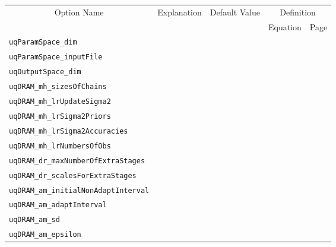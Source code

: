 \begin{sidewaystable}
\begin{tabular}{|l|c|c|c|c|}
\hline
\multicolumn{1}{|c|}{Option Name}        & Explanation       & Default Value & \multicolumn{2}{c|}{Definition} \\
\cline{4-5}
                                         &                   &               & Equation    & Page              \\
\hline
\verb=uqParamSpace_dim=                  &                   &               &             &                   \\
\hline
\verb=uqParamSpace_inputFile=            &                   &               &             &                   \\
\hline
\verb=uqOutputSpace_dim=                 &                   &               &             &                   \\
\hline
\verb=uqDRAM_mh_sizesOfChains=           &                   &               &             &                   \\
\hline
\verb=uqDRAM_mh_lrUpdateSigma2=          &                   &               &             &                   \\
\hline
\verb=uqDRAM_mh_lrSigma2Priors=          &                   &               &             &                   \\
\hline
\verb=uqDRAM_mh_lrSigma2Accuracies=      &                   &               &             &                   \\
\hline
\verb=uqDRAM_mh_lrNumbersOfObs=          &                   &               &             &                   \\
\hline
\verb=uqDRAM_dr_maxNumberOfExtraStages=  &                   &               &             &                   \\
\hline
\verb=uqDRAM_dr_scalesForExtraStages=    &                   &               &             &                   \\
\hline
\verb=uqDRAM_am_initialNonAdaptInterval= &                   &               &             &                   \\
\hline
\verb=uqDRAM_am_adaptInterval=           &                   &               &             &                   \\
\hline
\verb=uqDRAM_am_sd=                      &                   &               &             &                   \\
\hline
\verb=uqDRAM_am_epsilon=                 &                   &               &             &                   \\

\end{tabular}
\end{sidewaystable}
